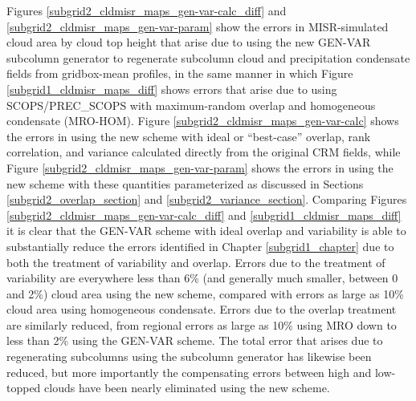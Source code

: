 Figures \ref{subgrid2_cldmisr_maps_gen-var-calc_diff} and \ref{subgrid2_cldmisr_maps_gen-var-param} show the errors in MISR-simulated cloud area by cloud top height that arise due to using the new GEN-VAR subcolumn generator to regenerate subcolumn cloud and precipitation condensate fields from gridbox-mean profiles, in the same manner in which Figure \ref{subgrid1_cldmisr_maps_diff} shows errors that arise due to using SCOPS/PREC\_SCOPS with maximum-random overlap and homogeneous condensate (MRO-HOM). Figure \ref{subgrid2_cldmisr_maps_gen-var-calc} shows the errors in using the new scheme with ideal or ``best-case'' overlap, rank correlation, and variance calculated directly from the original CRM fields, while Figure \ref{subgrid2_cldmisr_maps_gen-var-param} shows the errors in using the new scheme with these quantities parameterized as discussed in Sections \ref{subgrid2_overlap_section} and \ref{subgrid2_variance_section}. Comparing Figures \ref{subgrid2_cldmisr_maps_gen-var-calc_diff} and \ref{subgrid1_cldmisr_maps_diff} it is clear that the GEN-VAR scheme with ideal overlap and variability is able to substantially reduce the errors identified in Chapter \ref{subgrid1_chapter} due to both the treatment of variability and overlap. Errors due to the treatment of variability are everywhere less than 6\% (and generally much smaller, between 0 and 2\%) cloud area using the new scheme, compared with errors as large as 10\% cloud area using homogeneous condensate. Errors due to the overlap treatment are similarly reduced, from regional errors as large as 10\% using MRO down to less than 2\% using the GEN-VAR scheme. The total error that arises due to regenerating subcolumns using the subcolumn generator has likewise been reduced, but more importantly the compensating errors between high and low-topped clouds have been nearly eliminated using the new scheme.

